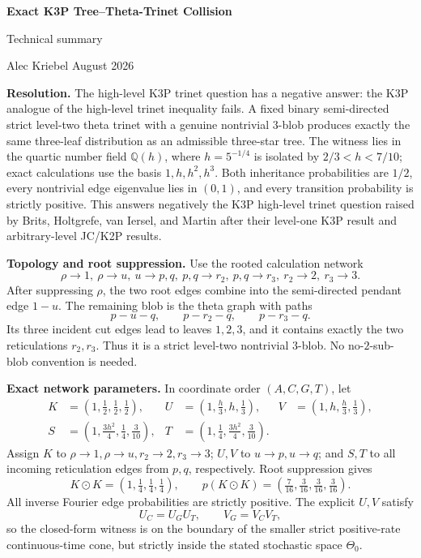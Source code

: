 \documentclass[10pt]{article}
\newcommand{\ThetaZero}{\Theta_0}
\newcommand{\odotv}{\mathbin{\odot}}
\begin{document}
\begin{center}
{\Large\bfseries Exact K3P Tree--Theta-Trinet Collision}\par\vspace{-1mm}
{\large Technical summary}\par\vspace{1mm}
Alec Kriebel \hfill August 2026
\end{center}

\textbf{Resolution.}
The high-level K3P trinet question has a negative answer: the K3P analogue of the high-level trinet inequality fails.  A fixed binary semi-directed strict level-two theta trinet with a genuine nontrivial $3$-blob produces exactly the same three-leaf distribution as an admissible three-star tree.  The witness lies in the quartic number field $\mathbb Q(h)$, where $h=5^{-1/4}$ is isolated by $2/3<h<7/10$; exact calculations use the basis $1,h,h^2,h^3$.  Both inheritance probabilities are $1/2$, every nontrivial edge eigenvalue lies in $(0,1)$, and every transition probability is strictly positive.  This answers negatively the K3P high-level trinet question raised by Brits, Holtgrefe, van Iersel, and Martin after their level-one K3P result and arbitrary-level JC/K2P results.

\textbf{Topology and root suppression.}
Use the rooted calculation network
\[
\rho\!\to\!1,\ \rho\!\to\!u,\ u\!\to\!p,q,\ p,q\!\to\!r_2,\ p,q\!\to\!r_3,\ r_2\!\to\!2,\ r_3\!\to\!3.
\]
After suppressing $\rho$, the two root edges combine into the semi-directed pendant edge $1-u$.  The remaining blob is the theta graph with paths
\[
 p-u-q,\qquad p-r_2-q,\qquad p-r_3-q.
\]
Its three incident cut edges lead to leaves $1,2,3$, and it contains exactly the two reticulations $r_2,r_3$.  Thus it is a strict level-two nontrivial $3$-blob.  No no-$2$-sub-blob convention is needed.

\textbf{Exact network parameters.}
In coordinate order $(A,C,G,T)$, let
\[
\begin{aligned}
K&=(1,\tfrac12,\tfrac12,\tfrac12),&
U&=(1,\tfrac h3,h,\tfrac13),&
V&=(1,h,\tfrac h3,\tfrac13),\\[-1mm]
S&=(1,\tfrac{3h^2}{4},\tfrac14,\tfrac3{10}),&
T&=(1,\tfrac14,\tfrac{3h^2}{4},\tfrac3{10}).
\end{aligned}
\]
Assign $K$ to $\rho\to1,\rho\to u,r_2\to2,r_3\to3$; $U,V$ to $u\to p,u\to q$; and $S,T$ to all incoming reticulation edges from $p,q$, respectively.  Root suppression gives
\[
K\odotv K=(1,\tfrac14,\tfrac14,\tfrac14),\qquad
p(K\odotv K)=(\tfrac7{16},\tfrac3{16},\tfrac3{16},\tfrac3{16}).
\]
All inverse Fourier edge probabilities are strictly positive.  The explicit $U,V$ satisfy
\[
U_C=U_GU_T,\qquad V_G=V_CV_T,
\]
so the closed-form witness is on the boundary of the smaller strict positive-rate continuous-time cone, but strictly inside the stated stochastic space $\ThetaZero$.
\end{document}
